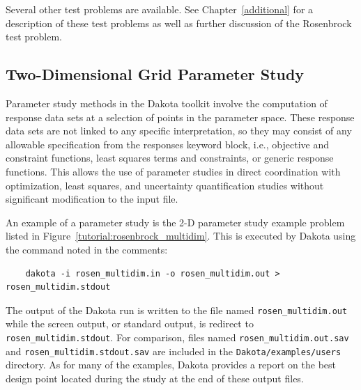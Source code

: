 Several other test problems are available. See
Chapter~\ref{additional} for a description of these test problems
as well as further discussion of the Rosenbrock test problem.


\subsection{Two-Dimensional Grid Parameter Study}\label{tutorial:examples:param_study}

Parameter study methods in the Dakota toolkit involve the computation 
of response data sets at a selection of points in the parameter space. 
These response data sets are not linked to any specific interpretation,
so they may consist of any allowable specification from the responses 
keyword block, i.e., objective and constraint functions, least squares 
terms and constraints, or generic response functions. This allows the 
use of parameter studies in direct coordination with optimization, least 
squares, and uncertainty quantification studies without significant
modification to the input file. 

An example of a parameter study is the 2-D parameter study example problem 
listed in Figure~\ref{tutorial:rosenbrock_multidim}. This is 
executed by Dakota using the command noted in the comments:
\begin{small}
\begin{verbatim}
    dakota -i rosen_multidim.in -o rosen_multidim.out > rosen_multidim.stdout
\end{verbatim}
\end{small}

The output of the Dakota run is written to the file named
\texttt{rosen\_multidim.out} while the screen output, or
standard output, is redirect to \texttt{rosen\_multidim.stdout}.
For comparison, files named \texttt{rosen\_multidim.out.sav}
and \texttt{rosen\_multidim.stdout.sav} are included in the
\texttt{Dakota/examples/users} directory. As for many of the examples,
Dakota provides a report on the best design point located during the
study at the end of these output files.

